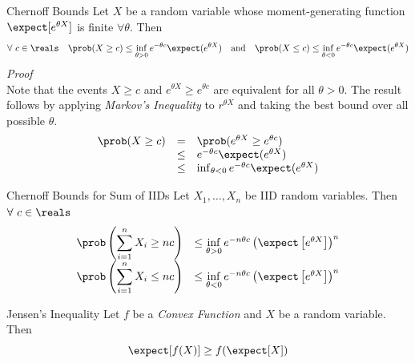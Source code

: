 \documentclass[11pt,a4paper]{article}
\begin{document}
\begin{theorem}{Chernoff Bounds}
  Let $X$ be a random variable whose moment-generating function $\expect[e^{\theta X}]$ is finite $\forall\theta$. Then
  \[ \forall\ c\in\reals\quad\prob(X\geq c)\leq\inf_{\theta>0}e^{-\theta c}\expect(e^{\theta X})\quad\text{and}\quad\prob(X\leq c)\leq\inf_{\theta<0}e^{-\theta c}\expect(e^{\theta X}) \]
  \textit{Proof}\\
  Note that the events $X\geq c$ and $e^{\theta X}\geq e^{\theta c}$ are equivalent for all $\theta>0$. The result follows by applying \textit{Markov's Inequality} to $r^{\theta X}$ and taking the best bound over all possible $\theta$.
  \[\begin{array}{rcl}
    \prob(X\geq c)&=&\prob(e^{\theta X}\geq e^{\theta c})\\
    &\leq&e^{-\theta c}\expect(e^{\theta X})\\
    &\leq&\inf_{\theta<0}e^{-\theta c}\expect(e^{\theta X}) %
  \end{array}\]
\end{theorem}

\begin{theorem}{Chernoff Bounds for Sum of IIDs}
  Let $X_1,\dots,X_n$ be IID random variables. Then $\forall\ c\in\reals$
  \[\begin{array}{rcl}
    {\displaystyle\prob\left(\sum_{i=1}^nX_i\geq nc\right)}&\leq\inf\limits_{\theta>0}e^{-n\theta c}\left(\expect\left[e^{\theta X}\right]\right)^n\\
    {\displaystyle\prob\left(\sum_{i=1}^nX_i\leq nc\right)}&\leq\inf\limits_{\theta<0}e^{-n\theta c}\left(\expect\left[e^{\theta X}\right]\right)^n
  \end{array}\]
\end{theorem}

\begin{theorem}{Jensen's Inequality}
  Let $f$ be a \textit{Convex Function} and $X$ be a random variable. Then
  \[ \expect[f(X)]\geq f(\expect[X]) \]
\end{theorem}
\end{document}
